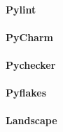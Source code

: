 \paragraph{Pylint}

\paragraph{PyCharm}

\paragraph{Pychecker}

\paragraph{Pyflakes}

\paragraph{Landscape}
